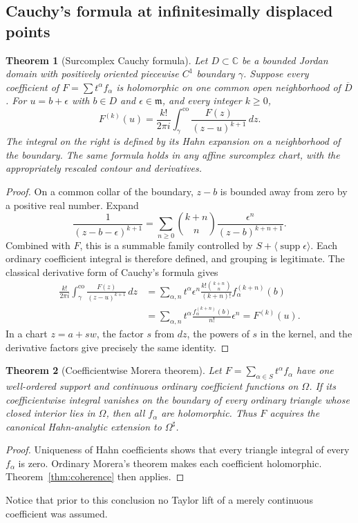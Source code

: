 \documentclass[11pt,a4paper]{article}
\numberwithin{equation}{section}
\newtheorem{theorem}{Theorem}[section]
\theoremstyle{definition}
\theoremstyle{remark}
\newcommand{\C}{\mathbb C}
\newcommand{\mm}{\mathfrak m}
\newcommand{\supp}{\operatorname{supp}}
\newcommand{\co}{\mathrm{co}}
\begin{document}
\subsection{Cauchy's formula at infinitesimally displaced points}
\begin{theorem}[Surcomplex Cauchy formula]
\label{thm:cauchy}
Let $D\subset\C$ be a bounded Jordan domain with positively oriented piecewise $C^1$ boundary $\gamma$. Suppose every coefficient of $F=\sum t^\alpha f_\alpha$ is holomorphic on one common open neighborhood of $\overline D$. For $u=b+\epsilon$ with $b\in D$ and $\epsilon\in\mm$, and every integer $k\geq0$,
\begin{equation}
\label{eq:cauchy}
 F^{(k)}(u)=\frac{k!}{2\pi i}
 \int_\gamma^{\co}\frac{F(z)}{(z-u)^{k+1}}\,dz.
\end{equation}
The integral on the right is defined by its Hahn expansion on a neighborhood of the boundary. The same formula holds in any affine surcomplex chart, with the appropriately rescaled contour and derivatives.
\end{theorem}
\begin{proof}
On a common collar of the boundary, $z-b$ is bounded away from zero by a positive real number. Expand
\[
 \frac1{(z-b-\epsilon)^{k+1}}
 =\sum_{n\geq0}\binom{k+n}{n}
 \frac{\epsilon^n}{(z-b)^{k+n+1}}.
\]
Combined with $F$, this is a summable family controlled by
$S+\langle\supp\epsilon\rangle$. Each ordinary coefficient integral is therefore defined, and grouping is legitimate. The classical derivative form of Cauchy's formula gives
\begin{align*}
 \frac{k!}{2\pi i}\int_\gamma^{\co}
       \frac{F(z)}{(z-u)^{k+1}}\,dz
 &=\sum_{\alpha,n}t^\alpha\epsilon^n
   \frac{k!\binom{k+n}{n}}{(k+n)!}
    f_\alpha^{(k+n)}(b)\\
 &=\sum_{\alpha,n}t^\alpha
   \frac{f_\alpha^{(k+n)}(b)}{n!}\epsilon^n
 =F^{(k)}(u).
\end{align*}
In a chart $z=a+sw$, the factor $s$ from $dz$, the powers of $s$ in the kernel, and the derivative factors give precisely the same identity.
\end{proof}

\begin{theorem}[Coefficientwise Morera theorem]
Let $F=\sum_{\alpha\in S}t^\alpha f_\alpha$ have one well-ordered support and continuous ordinary coefficient functions on $\Omega$. If its coefficientwise integral vanishes on the boundary of every ordinary triangle whose closed interior lies in $\Omega$, then all $f_\alpha$ are holomorphic. Thus $F$ acquires the canonical Hahn-analytic extension to $\Omega^\sharp$.
\end{theorem}
\begin{proof}
Uniqueness of Hahn coefficients shows that every triangle integral of every $f_\alpha$ is zero. Ordinary Morera's theorem makes each coefficient holomorphic. Theorem~\ref{thm:coherence} then applies.
\end{proof}
Notice that prior to this conclusion no Taylor lift of a merely continuous coefficient was assumed.
\end{document}

